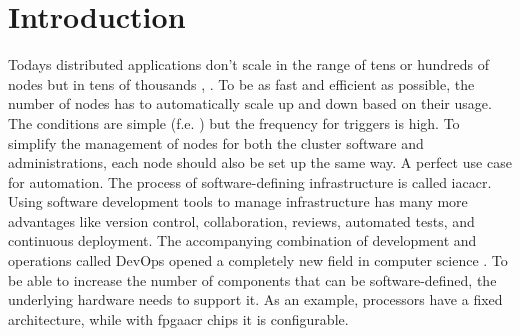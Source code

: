 

\chapter{Introduction}






Todays distributed applications don't scale in the range of tens or hundreds of nodes but in tens of thousands \cite{distributed_systems_concepts}, \cite{cluster_computing_whitepaper} \cite{kubernetes_15000_nodes}. To be as fast and efficient as possible, the number of nodes has to automatically scale up and down based on their usage. The conditions are simple (f.e. ) but the frequency for triggers is high. To simplify the management of nodes for both the cluster software and administrations, each node should also be set up the same way. A perfect use case for automation.
\newline
The process of software-defining infrastructure is called \gls{iacacr}. Using software development tools to manage infrastructure has many more advantages like version control, collaboration, reviews, automated tests, and continuous deployment. The accompanying combination of development and operations called DevOps opened a completely new field in computer science \cite{bachelor_thesis}. To be able to increase the number of components that can be software-defined, the underlying hardware needs to support it. As an example, processors have a fixed architecture, while with \gls{fpgaacr} chips it is configurable.


